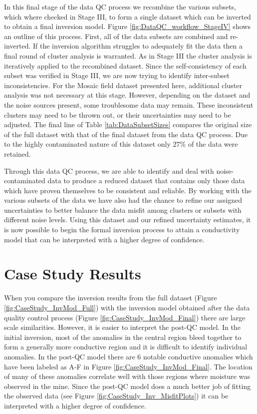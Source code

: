 \documentclass[final,authoryear,5p,times,twocolumn]{elsarticle}
\begin{document}
In this final stage of the data QC process we recombine the various subsets, which where checked in Stage III, to form a single dataset which can be inverted to obtain a final inversion model. Figure \ref{fig:DataQC_workflow_StageIV} shows an outline of this process. First, all of the data subsets are combined and re-inverted. If the inversion algorithm struggles to adequately fit the data then a final round of cluster analysis is warranted. As in Stage III the cluster analysis is iteratively applied to the recombined dataset. Since the self-consistency of each subset was verified in Stage III, we are now trying to identify inter-subset inconsistencies. For the Mosaic field dataset presented here, additional cluster analysis was not necessary at this stage. However, depending on the dataset and the noise sources present, some troublesome data may remain. These inconsistent clusters may need to be thrown out, or their uncertainties may need to be adjusted. The final line of Table \ref{tab:DataSubsetSizes} compares the original size of the full dataset with that of the final dataset from the data QC process. Due to the highly contaminated nature of this dataset only $27\%$ of the data were retained.     

Through this data QC process, we are able to identify and deal with noise-contaminated data to produce a reduced dataset that contains only those data which have proven themselves to be consistent and reliable. By working with the various subsets of the data we have also had the chance to refine our assigned uncertainties to better balance the data misfit among clusters or subsets with different noise levels. Using this dataset and our refined uncertainty estimates, it is now possible to begin the formal inversion process to attain a conductivity model that can be interpreted with a higher degree of confidence.   


\section{Case Study Results}
\label{Case_Study_Results}

When you compare the inversion results from the full dataset (Figure \ref{fig:CaseStudy_InvMod_Full}) with the inversion model obtained after the data quality control process (Figure \ref{fig:CaseStudy_InvMod_Final}) there are large scale similarities. However, it is easier to interpret the post-QC model. In the initial inversion, most of the anomalies in the central region bleed together to form a generally more conductive region and it is difficult to identify individual anomalies. In the post-QC model there are 6 notable conductive anomalies which have been labeled as A-F in Figure \ref{fig:CaseStudy_InvMod_Final}. The location of many of these anomalies correlate well with those regions where moisture was observed in the mine. Since the post-QC model does a much better job of fitting the observed data (see Figure \ref{fig:CaseStudy_Inv_MisfitPlots}) it can be interpreted with a higher degree of confidence. 
\end{document}
